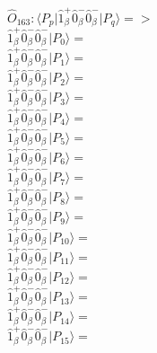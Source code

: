 \documentclass[14pt]{article}
\begin{document}
    $\hat{O}_{163}:  \langle{P_p}\vert \hat{1}_{\beta}^{+}\hat{0}_{\beta}^{-}\hat{0}_{\beta}^{-} \vert{P_q}\rangle => $ \\ 
    $ \hat{1}_{\beta}^{+}\hat{0}_{\beta}^{-}\hat{0}_{\beta}^{-} \vert{P_{0}}\rangle =  $ \\ 
    $ \hat{1}_{\beta}^{+}\hat{0}_{\beta}^{-}\hat{0}_{\beta}^{-} \vert{P_{1}}\rangle =  $ \\ 
    $ \hat{1}_{\beta}^{+}\hat{0}_{\beta}^{-}\hat{0}_{\beta}^{-} \vert{P_{2}}\rangle =  $ \\ 
    $ \hat{1}_{\beta}^{+}\hat{0}_{\beta}^{-}\hat{0}_{\beta}^{-} \vert{P_{3}}\rangle =  $ \\ 
    $ \hat{1}_{\beta}^{+}\hat{0}_{\beta}^{-}\hat{0}_{\beta}^{-} \vert{P_{4}}\rangle =  $ \\ 
    $ \hat{1}_{\beta}^{+}\hat{0}_{\beta}^{-}\hat{0}_{\beta}^{-} \vert{P_{5}}\rangle =  $ \\ 
    $ \hat{1}_{\beta}^{+}\hat{0}_{\beta}^{-}\hat{0}_{\beta}^{-} \vert{P_{6}}\rangle =  $ \\ 
    $ \hat{1}_{\beta}^{+}\hat{0}_{\beta}^{-}\hat{0}_{\beta}^{-} \vert{P_{7}}\rangle =  $ \\ 
    $ \hat{1}_{\beta}^{+}\hat{0}_{\beta}^{-}\hat{0}_{\beta}^{-} \vert{P_{8}}\rangle =  $ \\ 
    $ \hat{1}_{\beta}^{+}\hat{0}_{\beta}^{-}\hat{0}_{\beta}^{-} \vert{P_{9}}\rangle =  $ \\ 
    $ \hat{1}_{\beta}^{+}\hat{0}_{\beta}^{-}\hat{0}_{\beta}^{-} \vert{P_{10}}\rangle =  $ \\ 
    $ \hat{1}_{\beta}^{+}\hat{0}_{\beta}^{-}\hat{0}_{\beta}^{-} \vert{P_{11}}\rangle =  $ \\ 
    $ \hat{1}_{\beta}^{+}\hat{0}_{\beta}^{-}\hat{0}_{\beta}^{-} \vert{P_{12}}\rangle =  $ \\ 
    $ \hat{1}_{\beta}^{+}\hat{0}_{\beta}^{-}\hat{0}_{\beta}^{-} \vert{P_{13}}\rangle =  $ \\ 
    $ \hat{1}_{\beta}^{+}\hat{0}_{\beta}^{-}\hat{0}_{\beta}^{-} \vert{P_{14}}\rangle =  $ \\ 
    $ \hat{1}_{\beta}^{+}\hat{0}_{\beta}^{-}\hat{0}_{\beta}^{-} \vert{P_{15}}\rangle =  $ \\ 
    
\end{document}
